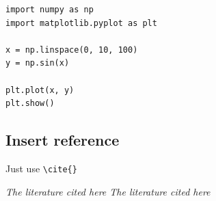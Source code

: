 \documentclass[12pt,hyperref,a4paper,UTF8]{article}
\begin{document}
\begin{lstlisting}[style=Python, title="Python code"]
import numpy as np
import matplotlib.pyplot as plt

x = np.linspace(0, 10, 100)
y = np.sin(x)

plt.plot(x, y)
plt.show()
\end{lstlisting}

\subsection{Insert reference}

Just use \verb|\cite{}|

   \textit{ The literature cited here  \cite{liu2023backdoor}  The literature cited here \cite{du2024sequential} }


\end{document}
